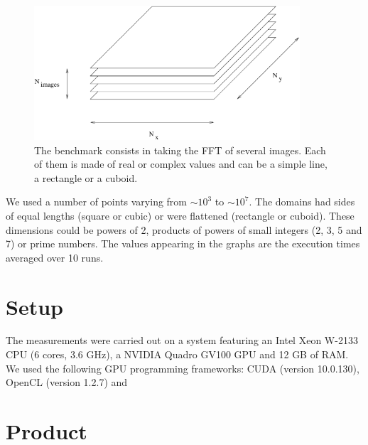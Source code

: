 \documentclass[12pt, a4paper]{article}
\begin{document}
\begin{figure}[H]
\captionsetup{width=0.6\textwidth}
\centering
\includegraphics[height=5cm]{benchmark.pdf}
\caption{The benchmark consists in taking the FFT of several images. Each of them is made of real or complex values and can be a simple line, a rectangle or a cuboid.}
\label{benchmark}
\end{figure}

We used a number of points varying from $\sim 10^3$ to $\sim 10^7$. The domains had sides of equal lengths (square or cubic) or were flattened (rectangle or cuboid). These dimensions could be powers of 2, products of powers of small integers (2, 3, 5 and 7) or prime numbers. The values appearing in the graphs are the execution times averaged over 10 runs.

\section{Setup}

The measurements were carried out on a system featuring an Intel Xeon W-2133 CPU (6 cores, 3.6 GHz), a NVIDIA Quadro GV100 GPU and 12 GB of RAM. We used the following GPU programming frameworks: CUDA (version 10.0.130), OpenCL (version 1.2.7) and  

\section{Product}
\end{document}
